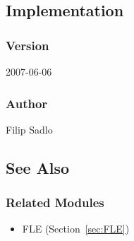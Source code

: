 \subsection{Implementation}


\subsubsection{Version}

2007-06-06


\subsubsection{Author}

Filip Sadlo


\subsection{See Also}


\subsubsection{Related Modules}

\begin{itemize}

\item
  FLE (Section~\ref{sec:FLE})
\end{itemize}

